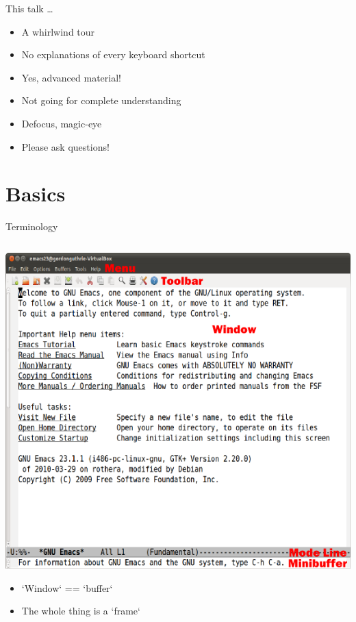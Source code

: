 \documentclass[bigger]{beamer}
\begin{document}
\begin{frame}[label=sec-2-2]{This talk \ldots{}}
\begin{itemize}
\item A whirlwind tour
\item No explanations of every keyboard shortcut
\item Yes, advanced material!
\item Not going for complete understanding
\item Defocus, magic-eye
\item Please ask questions!
\end{itemize}
\end{frame}

\section{Basics}
\label{sec-3}
\begin{frame}[label=sec-3-1]{Terminology}
\begin{columns}
\begin{column}{0.6\textwidth}
\includegraphics[width=.9\linewidth]{emacs-components.png}
\begin{itemize}
\item `Window` == `buffer`
\item The whole thing is a `frame`
\end{itemize}

\end{column}
\end{columns}
\end{frame}
\end{document}
